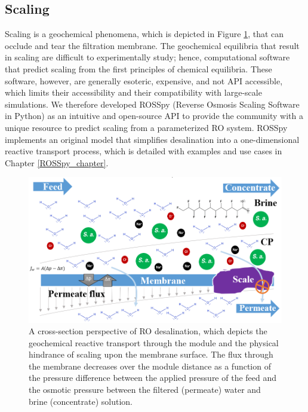 \subsection{Scaling}
Scaling is a geochemical phenomena, which is depicted in Figure \ref{desalination_schema}, that can occlude and tear the filtration membrane. The geochemical equilibria that result in scaling are difficult to experimentally study; hence, computational software that predict scaling from the first principles of chemical equilibria. These software, however, are generally esoteric, expensive, and not API accessible, which limits their accessibility and their compatibility with large-scale simulations. We therefore developed ROSSpy (Reverse Osmosis Scaling Software in Python) as an intuitive and open-source API to provide the community with a unique resource to predict scaling from a parameterized RO system. ROSSpy  implements an original model that simplifies desalination into a one-dimensional reactive transport process, which is detailed with examples and use cases in Chapter \ref{ROSSpy_chapter}.

\begin{figure}[h]
    \centering
    \includegraphics[width = \textwidth]{images/Introduction/desalination_schema_3.PNG}
    \caption{
        A cross-section perspective of RO desalination, which depicts the geochemical reactive transport through the module and the physical hindrance of scaling upon the membrane surface.  The flux through the membrane decreases over the module distance as a function of the pressure difference between the applied pressure of the feed and the osmotic pressure between the filtered (permeate) water and brine (concentrate) solution.  
    }
    \label{desalination_schema}
\end{figure}

